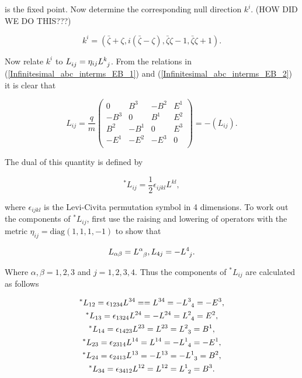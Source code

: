 \noindent is the fixed point. Now determine the corresponding null direction $k^i$. (HOW DID WE DO THIS???)

\begin{equation*}
k^i = (\bar{\zeta} + \zeta,i(\bar{\zeta} - \zeta),\bar{\zeta}\zeta - 1,\bar{\zeta}\zeta + 1).
\end{equation*}

\noindent Now relate $k^i$ to $\tensor{L}{_i_j} = \eta_{ij} \tensor{L}{^k_j}$. From the relations in (\ref{Infinitesimal_abc_interms_EB_1}) and (\ref{Infinitesimal_abc_interms_EB_2}) it is clear that

\begin{equation*}  
L_{ij} = 
\frac{q}{m}
\left(
\begin{array}{cccc}
0    & B^3  & -B^2 & E^1 \\
-B^3 & 0    & B^1  & E^2 \\
B^2  & -B^1 & 0    & E^3 \\
-E^1 & -E^2 & -E^3 & 0   \\
\end{array}
\right)
=
-(L_{ij}).
\end{equation*}

\noindent The dual of this quantity is defined by

\begin{equation*}
^*L_{ij} = \frac{1}{2} \epsilon_{ijkl} L^{kl},
\end{equation*}

\noindent where $\epsilon_{ijkl}$ is the Levi-Civita permutation symbol in 4 dimensions. To work out the components of $^*L_{ij}$, first use the raising and lowering of operators with the metric $\eta_{ij} = \text{diag}(1,1,1,-1)$ to show that  

\begin{eqnarray*}
L_{\alpha \beta} = \tensor{L}{^\alpha_\beta},
L_{4 j} = - \tensor{L}{^4_j}.
\end{eqnarray*}

\noindent Where $\alpha,\beta = 1,2,3$ and $j = 1,2,3,4$. Thus the components of $^*L_{ij}$ are calculated as follows

\begin{gather*}
^*L_{12} = \epsilon_{1234}L^{34} = = L^{34} = -\tensor{L}{^3_4} = -E^3, \\
^*L_{13} = \epsilon_{1324}L^{24} = - L^{24} = \tensor{L}{^2_4} = E^2,  \\
^*L_{14} = \epsilon_{1423}L^{23} = L^{23} = \tensor{L}{^2_3} =  B^1, \\
^*L_{23} = \epsilon_{2314}L^{14} = L^{14} = -\tensor{L}{^1_4} = -E^1, \\
^*L_{24} = \epsilon_{2413}L^{13} = -L^{13} =- \tensor{L}{^1_3} =  B^2,\\
^*L_{34} = \epsilon_{3412}L^{12} = L^{12} = \tensor{L}{^1_2} = B^3. \\
\end{gather*}

